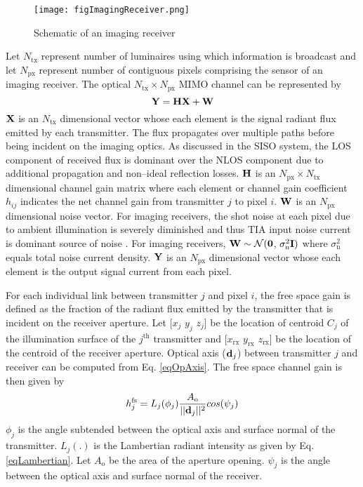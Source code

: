 \begin{figure}[!t]
	\centering
		\texttt{[image: figImagingReceiver.png]}
	\caption{Schematic of an imaging receiver}
	\label{figImagingReceiver}
\end{figure}

Let $N_{\text{tx}}$ represent number of luminaires using which information is broadcast and let $N_{\text{px}}$ represent number of contiguous pixels comprising the sensor of an imaging receiver. The optical $N_{\text{tx}} \times N_{\text{px}}$ MIMO channel can be represented by
\begin{equation}
	\label{eqMimoChannel3}
	\bf{Y} = \bf{H}\bf{X} + \bf{W}
\end{equation}
$\bf{X}$ is an $N_{\text{tx}}$ dimensional vector whose each element is the signal radiant flux emitted by each transmitter. The flux propagates over multiple paths before being incident on the imaging optics. As discussed in the SISO system, the LOS component of received flux is dominant over the NLOS component due to additional propagation and non--ideal reflection losses. $\bf{H}$ is an $N_{\text{px}}\times N_{\text{tx}}$ dimensional channel gain matrix where each element or channel gain coefficient $h_{ij}$ indicates the net channel gain from transmitter $j$ to pixel $i$. $\bf{W}$ is an $N_{\text{px}}$ dimensional noise vector. For imaging receivers, the shot noise at each pixel due to ambient illumination is severely diminished \cite{dja00a} and thus TIA input noise current is dominant source of noise \cite{kah97a}. For imaging receivers, ${\bf{W}}\sim\mathcal{N}({\bf{0}}$, $\sigma_{\text{n}}^2{\bf{I}})$ where $\sigma_{\text{n}}^{2}$ equals total noise current density. $\bf{Y}$ is an $N_{\text{px}}$ dimensional vector whose each element is the output signal current from each pixel.

For each individual link between transmitter $j$ and pixel $i$, the free space gain is defined as the fraction of the radiant flux emitted by the transmitter that is incident on the receiver aperture. Let [$x_{j}$ $y_{j}$ $z_{j}$] be the location of centroid $C_{j}$ of the illumination surface of the $j^{\text{th}}$ transmitter and [$x_{\text{rx}}$ $y_{\text{rx}}$ $z_{\text{rx}}$] be the location of the centroid of the receiver aperture. Optical axis (${\bf{d}}_{j}$) between transmitter $j$ and receiver can be computed from Eq. \eqref{eqOpAxis}. The free space channel gain is then given by
\begin{equation}
	\label{eqMimoHFS}
	h^{\text{fs}}_{j} = L_{j}(\phi_{j})\frac{A_{\text{o}}}{||{\bf{d}}_{j}||^2}cos(\psi_{j})
\end{equation}
$\phi_{j}$ is the angle subtended between the optical axis and surface normal of the transmitter. $L_{j}(.)$ is the Lambertian radiant intensity as given by Eq. \eqref{eqLambertian}. Let $A_{\text{o}}$ be the area of the aperture opening. $\psi_{j}$ is the angle between the optical axis and surface normal of the receiver.

